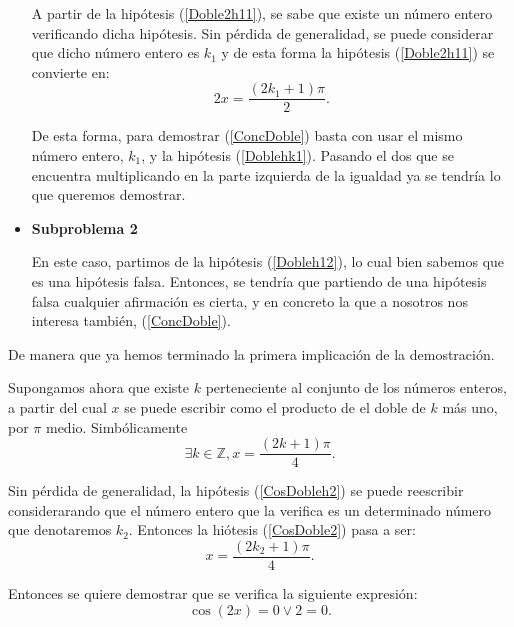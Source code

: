 \begin{demostracion}
\begin{itemize}
    A partir de la hipótesis (\ref{Doble2h11}), se sabe que existe
    un número entero verificando dicha hipótesis. Sin pérdida de
    generalidad, se puede considerar que dicho número entero es
    \(k_1\) y de esta forma la hipótesis (\ref{Doble2h11}) se
    convierte en:
    \begin{equation}\label{Doblehk1}\tag{hk1}
       2x=\frac{(2k_1+1)π}{2}.
    \end{equation}

    De esta forma, para demostrar (\ref{ConcDoble}) basta con usar
    el mismo número entero, \(k_1\), y la hipótesis
    (\ref{Doblehk1}). Pasando el dos que se encuentra multiplicando
    en la parte izquierda de la igualdad ya se tendría lo que
    queremos demostrar.

  \item \textbf{Subproblema 2}

    En este caso, partimos de la hipótesis (\ref{Dobleh12}), lo cual
    bien sabemos que es una hipótesis falsa. Entonces, se tendría
    que partiendo de una hipótesis falsa cualquier afirmación es
    cierta, y en concreto la que a nosotros nos interesa también,
    (\ref{ConcDoble}).
  \end{itemize}

  De manera que ya hemos terminado la primera implicación de la
  demostración.

   \noindent
   \framebox{\longleftarrow} Supongamos ahora que existe \(k\)
   perteneciente al conjunto de los números enteros, a partir del
   cual \(x\) se puede escribir como el producto de el doble de
   \(k \) más uno, por \( π \) medio. Simbólicamente
   \begin{equation}\label{CosDobleh2}\tag{h2}
      ∃ k ∈ ℤ, x=\frac{(2k+1)π}{4}.
    \end{equation}

    Sin pérdida de generalidad, la hipótesis (\ref{CosDobleh2}) se
    puede reescribir considerarando que el número entero que la
    verifica es un determinado número que denotaremos \(k_2\).
    Entonces la hiótesis (\ref{CosDoble2}) pasa a ser:
    \begin{equation}\label{hk2}\tag{hk2}
       x=\frac{(2k_2+1)π}{4}.
    \end{equation}

    Entonces se quiere demostrar que se verifica la siguiente
    expresión:
    \begin{equation}\label{ConcDoble2}
      \cos(2x)=0 \lor 2=0.
    \end{equation}


\end{demostracion}
